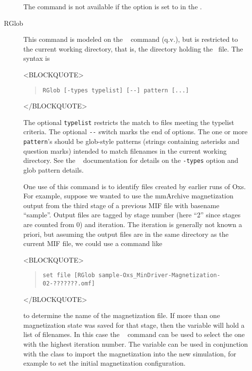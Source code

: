\begin{description}
The  command is not available if the 
option is set to  in the 
.

\item[RGlob\label{html:mif2rglob}]
This command is modeled on the \Tcl\  command (q.v.), but
is restricted to the current working directory, that is, the
directory holding the \MIF\ file.  The syntax is
\begin{rawhtml}<BLOCKQUOTE>\end{rawhtml}
\begin{quote}
\begin{verbatim}
RGlob [-types typelist] [--] pattern [...]
\end{verbatim}
\end{quote}
\begin{rawhtml}</BLOCKQUOTE>\end{rawhtml}
The optional \texttt{typelist} restricts the match to files meeting the
typelist criteria.  The optional \verb+--+ switch marks the end of
options.  The one or more \texttt{pattern}'s should be glob-style
patterns (strings containing asterisks and question marks) intended to
match filenames in the current working directory.  See the \Tcl\
 documentation for details on the \texttt{-types} option and
glob pattern details.

One use of this command is to identify files created by earlier runs of
Oxs.  For example, suppose we wanted to use the mmArchive magnetization
output from the third stage of a previous MIF file with basename ``sample''.
Output files are tagged by stage number (here ``2'' since stages are
counted from 0) and iteration.  The iteration is generally not known a
priori, but assuming the output files are in the same directory as the
current MIF file, we could use a command like
\begin{rawhtml}<BLOCKQUOTE>\end{rawhtml}
\begin{quote}
\begin{verbatim}
set file [RGlob sample-Oxs_MinDriver-Magnetization-02-???????.omf]
\end{verbatim}
\end{quote}
\begin{rawhtml}</BLOCKQUOTE>\end{rawhtml}
to determine the name of the magnetization file.  If more than one
magnetization state was saved for that stage, then the variable
 will hold a list of filenames.  In this case the \Tcl\ 
command can be used to select the one with the highest iteration number.
The \cd{file} variable can be used in conjunction with the
class to import the magnetization into the new simulation, for example
to set the initial magnetization configuration.


\end{description}
